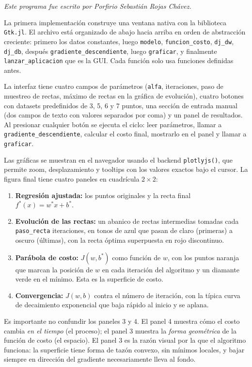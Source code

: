 \documentclass[11pt,a4paper]{article}
\begin{document}
\textit{Este programa fue escrito por Porfirio Sebasti\'an Rojas Ch\'avez.}

La primera implementaci\'on construye una ventana nativa con la biblioteca \texttt{Gtk.jl}. El archivo est\'a organizado de abajo hacia arriba en orden de abstracci\'on creciente: primero los datos constantes, luego \texttt{modelo}, \texttt{funcion\_costo}, \texttt{dj\_dw}, \texttt{dj\_db}, despu\'es \texttt{gradiente\_descendiente}, luego \texttt{graficar}, y finalmente \texttt{lanzar\_aplicacion} que es la GUI. Cada funci\'on solo usa funciones definidas antes.

La interfaz tiene cuatro campos de par\'ametros (\texttt{alfa}, iteraciones, paso de muestreo de rectas, m\'aximo de rectas en la gr\'afica de evoluci\'on), cuatro botones con datasets predefinidos de 3, 5, 6 y 7 puntos, una secci\'on de entrada manual (dos campos de texto con valores separados por coma) y un panel de resultados. Al presionar cualquier bot\'on se ejecuta el ciclo: leer par\'ametros, llamar a \texttt{gradiente\_descendiente}, calcular el costo final, mostrarlo en el panel y llamar a \texttt{graficar}.

Las gr\'aficas se muestran en el navegador usando el backend \texttt{plotlyjs()}, que permite zoom, desplazamiento y tooltips con los valores exactos bajo el cursor. La figura final tiene cuatro paneles en cuadr\'icula $2\times 2$:

\begin{enumerate}
  \item \textbf{Regresi\'on ajustada:} los puntos originales y la recta final $f^{*}(x) = w^{*}x + b^{*}$.
  \item \textbf{Evoluci\'on de las rectas:} un abanico de rectas intermedias tomadas cada \texttt{paso\_recta} iteraciones, en tonos de azul que pasan de claro (primeras) a oscuro (\'ultimas), con la recta \'optima superpuesta en rojo discontinuo.
  \item \textbf{Par\'abola de costo:} $J(w, b^{*})$ como funci\'on de $w$, con los puntos naranja que marcan la posici\'on de $w$ en cada iteraci\'on del algoritmo y un diamante verde en el m\'inimo. Esta es la superficie de costo.
  \item \textbf{Convergencia:} $J(w,b)$ contra el n\'umero de iteraci\'on, con la t\'ipica curva de decaimiento exponencial que baja r\'apido al inicio y se aplana.
\end{enumerate}

Es importante no confundir los paneles 3 y 4. El panel 4 muestra c\'omo el costo cambia \emph{en el tiempo} (el proceso); el panel 3 muestra la \emph{forma geom\'etrica} de la funci\'on de costo (el espacio). El panel 3 es la raz\'on visual por la que el algoritmo funciona: la superficie tiene forma de taz\'on convexo, sin m\'inimos locales, y bajar siempre en direcci\'on del gradiente necesariamente lleva al fondo.
\end{document}
